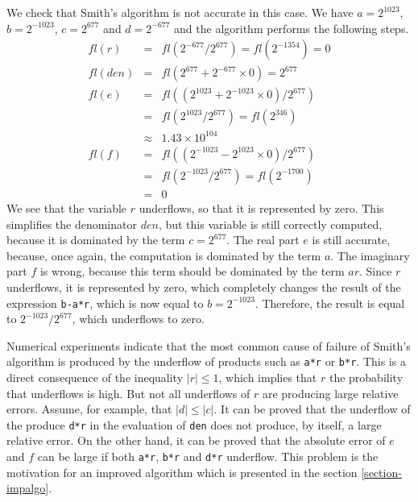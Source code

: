 \documentclass{paper}
\newcommand{\scivar}[1]{\texttt{#1}}
\begin{document}
We check that Smith's algorithm is not accurate in this case. 
We have $a=2^{1023}$, $b=2^{-1023}$, $c=2^{677}$ and $d=2^{-677}$ and 
the algorithm performs the following steps.
\begin{eqnarray}
fl(r) 
&=& fl(2^{-677} / 2^{677}) = fl(2^{-1354}) = 0 \nonumber \\
fl(den)  
&=& fl(2^{677} + 2^{-677} \times 0)  = 2^{677} \nonumber \\
fl(e) 
&=& fl((2^{1023} + 2^{-1023} \times 0) / 2^{677}) \nonumber \\
&=& fl(2^{1023} / 2^{677})  = fl(2^{346}) \nonumber \\
&\approx& 1.43 \times 10^{104} \nonumber \\
fl(f) 
&=& fl((2^{-1023} - 2^{1023} \times 0) / 2^{677}) \nonumber  \\
&=& fl(2^{-1023} / 2^{677})  = fl(2^{-1700}) \nonumber \\
&=& 0 \nonumber 
\end{eqnarray}
We see that the variable $r$ underflows, so that it is 
represented by zero. 
This simplifies the denominator $den$,
but this variable is still correctly computed, because it is dominated 
by the term $c=2^{677}$. 
The real part $e$ is still accurate, because,
once again, the computation is dominated by the term $a$.
The imaginary part $f$ is wrong, because this term should be 
dominated by the term $ar$. 
Since $r$ underflows, it 
is represented by zero, which completely changes the result of the 
expression \scivar{b-a*r}, which is now equal to $b=2^{-1023}$.
Therefore, the result is equal to $2^{-1023} / 2^{677}$, which 
underflows to zero. 

Numerical experiments indicate that the most common cause of failure 
of Smith's algorithm is produced by the underflow of products such as 
\scivar{a*r} or \scivar{b*r}.
This is a direct consequence of the inequality $|r|\leq 1$, which implies 
that $r$ the probability that underflows is high. 
But not all underflows of $r$ are producing large relative errors. 
Assume, for example, that $|d|\leq |c|$. 
It can be proved \cite{BaudinSmithImpCD2011} that the underflow of the 
produce \scivar{d*r} in the evaluation of \scivar{den} does not produce, 
by itself, a large relative error.
On the other hand, it can be proved that the absolute error of $e$ 
and $f$ can be large if both \scivar{a*r}, \scivar{b*r} and 
\scivar{d*r} underflow. 
This problem is the motivation for an improved algorithm which 
is presented in the section \ref{section-impalgo}.
\end{document}
